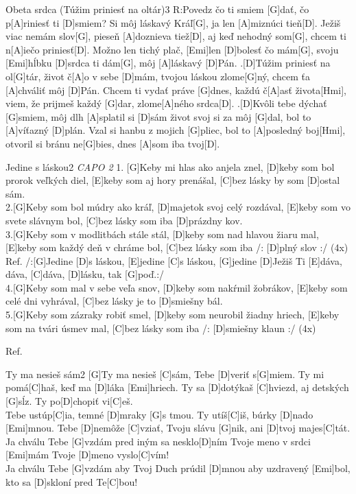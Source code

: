 \documentclass[12pt]{article}
\begin{document}
\begin{song}{Obeta srdca (Túžim priniesť na oltár)}{3}
	R:Povedz čo ti smiem [G]dať, 
	čo p[A]riniesť ti [D]smiem?
	Si môj láskavý Kráľ[G], 
	ja len [A]miznúci tieň[D].
	Ježiš viac nemám slov[G], 
	pieseň [A]doznieva tiež[D],
	aj keď nehodný som[G], 
	chcem ti n[A]iečo priniesť[D].
	Možno len tichý plač, 
	[Emi]len [D]bolesť čo mám[G],
	svoju [Emi]hĺbku [D]srdca ti dám[G], 
	môj [A]láskavý [D]Pán.	
	.[D]Túžim priniesť na ol[G]tár, 
	život č[A]o v sebe [D]mám,
	tvojou láskou zlome[G]ný, 
	chcem ťa [A]chváliť môj [D]Pán.
	Chcem ti vydať práve [G]dnes, 
	každú č[A]asť života[Hmi],
	viem, že prijmeš každý [G]dar, 
	zlome[A]ného srdca[D].
	.[D]Kvôli tebe dýchať [G]smiem, 
	môj dlh [A]splatil si [D]sám
	život svoj si za môj [G]dal, 
	bol to [A]víťazný [D]plán.
	Vzal si hanbu z mojich [G]pliec, 
	bol to [A]posledný boj[Hmi], 
	otvoril si bránu ne[G]bies, 
	dnes [A]som iba tvoj[D].
\end{song}
	
\begin{song}{Jedine s láskou}{2}
	\textit{CAPO 2}
	1.
	[G]Keby mi hlas ako anjela znel, [D]keby som bol prorok veľkých diel,
	[E]keby som aj hory prenášal, [C]bez lásky by som [D]ostal sám.
	\\
	2.[G]Keby som bol múdry ako kráľ, [D]majetok svoj celý rozdával,
	[E]keby som vo svete slávnym bol, [C]bez lásky som iba [D]prázdny kov.
	\\
	3.[G]Keby som v modlitbách stále stál, [D]keby som nad hlavou žiaru mal,
	[E]keby som každý deň v chráme bol, [C]bez lásky som iba /: [D]plný slov :/ (4x)
	\columnbreak
	Ref.
	/:[G]Jedine [D]s láskou, [E]jedine [C]s láskou,
	[G]jedine [D]Ježiš Ti [E]dáva, dáva, [C]dáva, [D]lásku, tak [G]poď.:/ 
	\\
	4.[G]Keby som mal v sebe veľa snov, [D]keby som nakŕmil žobrákov,
	[E]keby som celé dni vyhrával, [C]bez lásky je to [D]smiešny bál.
	\\
	5.[G]Keby som zázraky robiť smel, [D]keby som neurobil žiadny hriech,
	[E]keby som na tvári úsmev mal, [C]bez lásky som iba  /: [D]smiešny klaun :/ (4x)
	
	Ref.
\end{song}

\begin{song}{Ty ma nesieš sám}{2}
	[G]Ty ma nesieš [C]sám, Tebe [D]veriť s[G]miem.
	Ty mi pomá[C]haš, keď ma [D]láka [Emi]hriech.
	Ty sa [D]dotýkaš [C]hviezd, aj detských [G]sĺz.
	Ty po[D]chopiť vi[C]eš.
	\\
	[G]Tebe ustúp[C]ia, temné [D]mraky [G]s tmou.
	Ty utíš[C]iš, búrky [D]nado [Emi]mnou.
	Tebe [D]nemôže [C]vziať, Tvoju slávu [G]nik,
	ani [D]tvoj majes[C]tát.
	\columnbreak
	[C]Ja chválu Tebe [G]vzdám
	pred iným sa nesklo[D]ním
	Tvoje meno v srdci [Emi]mám
	Tvoje [D]meno vyslo[C]vím!
	\\
	[C]Ja chválu Tebe [G]vzdám
	aby Tvoj Duch prúdil [D]mnou
	aby uzdravený [Emi]bol,
	kto sa [D]skloní pred Te[C]bou!
\end{song}
\end{document}
